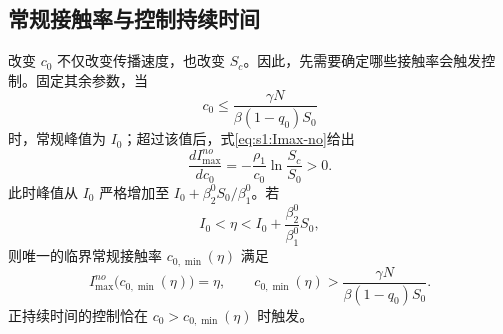 \documentclass[lang=cn,a4paper,newtx]{elegantpaper}
\numberwithin{equation}{section}
\theoremstyle{plain}
\begin{document}
\subsection{常规接触率与控制持续时间}
改变 $c_0$ 不仅改变传播速度，也改变 $S_c$。因此，先需要确定哪些接触率会触发控制。固定其余参数，当
\[
c_0\le\frac{\gamma N}{\beta(1-q_0)S_0}
\]
时，常规峰值为 $I_0$；超过该值后，式\eqref{eq:s1:Imax-no}给出
\begin{equation}
\frac{dI_{\max}^{no}}{dc_0}
=-\frac{\rho_1}{c_0}\ln\frac{S_c}{S_0}>0.
\label{eq:s1:Imax-no-c0-derivative}
\end{equation}
此时峰值从 $I_0$ 严格增加至 $I_0+\beta_2^0 S_0/\beta_1^0$。若
\[
I_0<\eta<I_0+\frac{\beta_2^0}{\beta_1^0}S_0,
\]
则唯一的临界常规接触率 $c_{0,\min}(\eta)$ 满足
\begin{equation}
I_{\max}^{no}\bigl(c_{0,\min}(\eta)\bigr)=\eta,
\qquad c_{0,\min}(\eta)>\frac{\gamma N}{\beta(1-q_0)S_0}.
\label{eq:s1:c0-min-def}
\end{equation}
正持续时间的控制恰在 $c_0>c_{0,\min}(\eta)$ 时触发。
\end{document}
